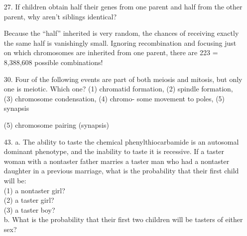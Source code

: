 \documentclass[11pt]{article}
\begin{document}
 

\begin{enumerate}
\item[27.]{If children obtain half their genes from one parent and half from the other parent, why aren’t siblings identical?}

\item[]{Because the “half” inherited is very random, the chances of receiving exactly the same half is vanishingly small. Ignoring recombination and focusing just on which chromosomes are inherited from one parent, there are 223 = 8,388,608 possible combinations!}

\item[30.]{Four of the following events are part of both meiosis and mitosis, but only one is meiotic. Which one? (1) chromatid formation, (2) spindle formation, (3) chromosome condensation, (4) chromo- some movement to poles, (5) synapsis} 

\item[]{(5) chromosome pairing (synapsis)}

\item[43.] {a. The ability to taste the chemical phenylthiocarbamide is an autosomal dominant phenotype, and the inability to taste it is recessive. If a taster woman with a nontaster father marries a taster man who had a nontaster daughter in a previous marriage, what is the probability that their first child will be:\\
(1) a nontaster girl?\\
(2) a taster girl?\\
(3) a taster boy?\\
b. What is the probability that their first two children will be tasters of either sex?}
\end{enumerate}
\end{document}
